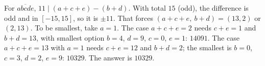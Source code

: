 For $\overline{abcde}$, $11\mid(a+c+e)-(b+d)$. With total $15$ (odd), the difference is odd and in $[-15,15]$, so it is $\pm11$. That forces $(a+c+e,\ b+d)=(13,2)$ or $(2,13)$. To be smallest, take $a=1$. The case $a+c+e=2$ needs $c+e=1$ and $b+d=13$, with smallest option $b=4$, $d=9$, $c=0$, $e=1$: $14091$. The case $a+c+e=13$ with $a=1$ needs $c+e=12$ and $b+d=2$; the smallest is $b=0$, $c=3$, $d=2$, $e=9$: $10329$. The answer is $\boxed{10329}$.
